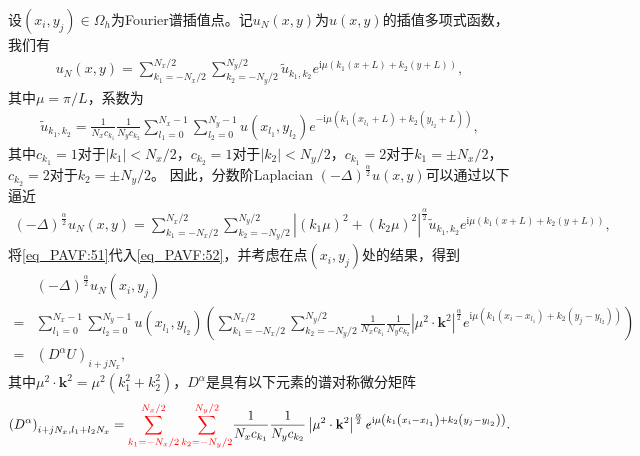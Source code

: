 设$\left(x_{i}, y_{j}\right) \in \Omega_{h}$为Fourier谱插值点。记$u_{N}(x, y)$为$u(x, y)$的插值多项式函数，我们有
\begin{align}\label{eq_PAVF:50}
u_{N}(x, y)=\sum_{k_{1}=-N_{x} / 2}^{N_{x} / 2} \sum_{k_{2}=-N_{y} / 2}^{N_{y} / 2} \tilde{u}_{k_{1}, k_{2}} e^{\mathrm{i}\mu\left( k_{1} (x+L)+k_{2}(y+L)\right)},
\end{align}
其中$\mu={\pi}/{L}$，系数为
\begin{align}\label{eq_PAVF:51}
\tilde{u}_{k_{1}, k_{2}}=\frac{1}{N_{x} c_{k_{1}}} \frac{1}{N_{y} c_{k_{2}}} \sum_{l_1=0}^{N_{x}-1} \sum_{l_2=0}^{N_{y}-1} u(x_{l_1}, y_{l_2}) e^{-\mathrm{i}\mu\left( k_{1}(x_{l_1}+L)+k_{2}(y_{l_2}+L)\right)},
\end{align}
其中$c_{k_{1}}=1$对于$\left|k_{1}\right|<N_{x} / 2$，$c_{k_{2}}=1$对于$\left|k_{2}\right|<N_{y} / 2$，$c_{k_{1}}=2$对于$k_{1}=\pm N_{x} / 2$，$c_{k_{2}}=2$对于$k_{2}=\pm N_{y} / 2$。
因此，分数阶Laplacian $(-\Delta)^{\frac{\alpha}{2}} u(x, y)$可以通过以下逼近
\begin{align}\label{eq_PAVF:52}
(-\Delta)^{\frac{\alpha}{2}} u_{N}\left(x, y\right)=\sum\limits_{k_{1}=-N_{x} / 2}^{N_{x} / 2} \sum\limits_{k_{2}=-N_{y} / 2}^{N_{y} / 2}\left|\left(k_{1} \mu\right)^{2}+\left(k_{2} \mu\right)^{2}\right|^{\frac{\alpha}{2}} \tilde{u}_{k_{1}, k_{2}} e^{\mathrm{i}\mu\left( k_{1} (x+L)+k_{2}(y+L)\right)},
\end{align}
将\eqref{eq_PAVF:51}代入\eqref{eq_PAVF:52}，并考虑在点$(x_i,y_j)$处的结果，得到
\begin{align}
&(-\Delta)^{\frac{\alpha}{2}} u_{N}\left(x_{i}, y_{j}\right)\nonumber\\
=&\sum\limits_{l_{1}=0}^{N_{x}-1} \sum\limits_{l_{2}=0}^{N_{y}-1}u(x_{l_{1}}, y_{l_{2}})\left(\sum\limits_{k_{1}=-N_{x} / 2}^{N_{x} / 2} \sum\limits_{k_{2}=-N_{y} / 2}^{N_{y} / 2} \frac{1}{N_{x} c_{k_{1}}} \frac{1}{N_{y} c_{k_{2}}}\left|\mu^{2} \cdot \mathbf{k}^{2}\right|^{\frac{\alpha}{2}} e^{\mathrm{i} \mu\left(k_{1}\left(x_{i}-x_{l_{1}}\right)+k_{2}\left(y_{j}-y_{l_{2}}\right)\right)}\right)\nonumber\\
=&\left(D^{\alpha}U\right)_{i+j N_{x}},\label{eq_PAVF:53}
\end{align}
其中$\mu^{2} \cdot \mathbf{k}^{2}=\mu^{2}\left(k_{1}^{2}+k_{2}^{2}\right)$，$D^{\alpha}$是具有以下元素的谱对称微分矩阵
\begin{align}\label{eq_PAVF:54}
\left(D^{\alpha}\right)_{i+j N_{x}, l_{1}+l_{2} N_{x}}=\textcolor[rgb]{1.00,0.00,0.00}{\sum\limits_{k_{1}=-N_{x} / 2}^{N_{x} / 2} \sum\limits_{k_{2}=-N_{y} / 2}^{N_{y} / 2}}\frac{1}{N_{x} c_{k_{1}}} \frac{1}{N_{y} c_{k_{2}}}\left|\mu^{2} \cdot \mathbf{k}^{2}\right|^{\frac{\alpha}{2}} e^{\mathrm{i}\mu\left(k_{1}\left(x_{i}-x_{l_{1}}\right)+k_{2}\left(y_{j}-y_{l_{2}}\right)\right)}.
\end{align}

